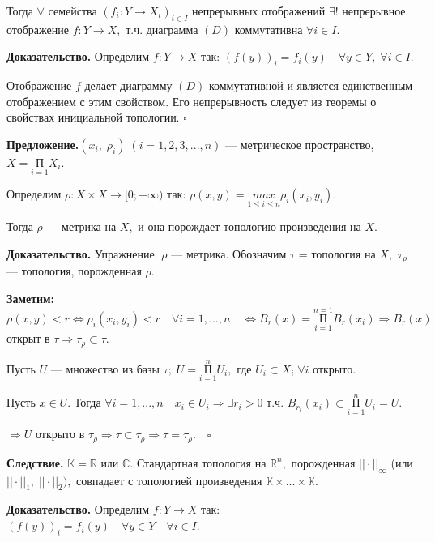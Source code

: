 \documentclass[12pt,a4paper]{article}
\begin{document}
Тогда $\forall$ семейства $(f_{i}: Y \to X_{i})_{i \in I}$ непрерывных отображений $\exists !$ непрерывное отображение $f: Y \to X,$ т.ч. диаграмма $(D)$ коммутативна $\forall i \in I.$ 

\textbf{Доказательство.} Определим $f: Y \to X$ так: $(f(y))_{i} = f_{i}(y) \quad \forall y \in Y, \; \forall i \in I.$

Отображение $f$ делает диаграмму $(D)$ коммутативной и является единственным отображением с этим свойством. Его непрерывность следует из теоремы о свойствах инициальной топологии. $\square$ 

\textbf{Предложение.}$(x_{i}, \; \rho_{i}) \; (i = 1, 2, 3, ..., n)$ --- метрическое пространство, $X = \underset{i = 1}{\text{П}} X_{i}.$

Определим $\rho: X \times X \to [0; +\infty)$ так: $\rho(x, y) = \underset{1 \leq i \leq n}{max} \rho_{i}(x_{i}, y_{i}).$ 

Тогда $\rho$ --- метрика на $X,$ и она порождает топологию произведения на $X.$ 

\textbf{Доказательство.} Упражнение. $\rho$ --- метрика. Обозначим $\tau$ = топология на $X,$ $\tau_{\rho}$ --- топология, порожденная $\rho.$ 

\textbf{Заметим:} $\rho(x, y) < r \Leftrightarrow \rho_{i}(x_{i}, y_{i}) < r \quad \forall i = 1, ..., n \quad \Leftrightarrow B_{r}(x) = \overset{n = 1}{\underset{i = 1}{\text{П}}} B_{r}(x_{i}) \Rightarrow B_{r}(x)$ открыт в $\tau \Rightarrow \tau_{\rho} \subset \tau.$

Пусть $U$ --- множество из базы $\tau; \; U = \overset{n}{\underset{i = 1}{\text{П}}} U_{i},$ где $U_{i} \subset X_{i} \; \forall i$ открыто. 

Пусть $x \in U.$ Тогда $\forall i = 1, ..., n \quad x_{i} \in U_{i} \Rightarrow \exists r_{i} > 0$ т.ч. $B_{r_{i}} (x_{i}) \subset \overset{n}{\underset{i = 1}{\text{П}}} U_{i} = U.$ 

$\Rightarrow U$ открыто в $\tau_{\rho} \Rightarrow \tau \subset \tau_{\rho} \Rightarrow \tau = \tau_{\rho}. \quad \square$ 

\textbf{Следствие.} $\mathbb{K} = \mathbb{R}$ или $\mathbb{C}.$ Стандартная топология на $\mathbb{R}^{n},$ порожденная $|| \cdot ||_{\infty}$ (или $|| \cdot ||_{1}, \; || \cdot ||_{2}),$ совпадает с топологией произведения $\mathbb{K} \times ... \times \mathbb{K}.$

\textbf{Доказательство.} Определим $f: Y \to X$ так: $(f(y))_{i} = f_{i}(y) \quad \forall y \in Y \quad \forall i \in I.$ 
\end{document}
